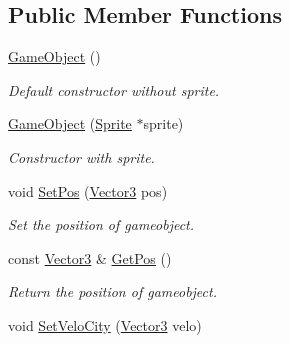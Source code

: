 \subsection*{Public Member Functions}
\begin{DoxyCompactItemize}
\item 
\mbox{\label{class_game_object_a0348e3ee2e83d56eafca7a3547f432c4}} 
\mbox{\hyperlink{class_game_object_a0348e3ee2e83d56eafca7a3547f432c4}{Game\+Object}} ()
\begin{DoxyCompactList}\small\item\em Default constructor without sprite. \end{DoxyCompactList}\item 
\mbox{\label{class_game_object_a8f340c31ff5aa975ae2ed7439fb5d63f}} 
\mbox{\hyperlink{class_game_object_a8f340c31ff5aa975ae2ed7439fb5d63f}{Game\+Object}} (\mbox{\hyperlink{class_sprite}{Sprite}} $\ast$sprite)
\begin{DoxyCompactList}\small\item\em Constructor with sprite. \end{DoxyCompactList}\item 
\mbox{\label{class_game_object_a53997902466d2ecb317c4318a3d69816}} 
void \mbox{\hyperlink{class_game_object_a53997902466d2ecb317c4318a3d69816}{Set\+Pos}} (\mbox{\hyperlink{class_vector3}{Vector3}} pos)
\begin{DoxyCompactList}\small\item\em Set the position of gameobject. \end{DoxyCompactList}\item 
\mbox{\label{class_game_object_ab66324d123ba785d66a11b386a5c0893}} 
const \mbox{\hyperlink{class_vector3}{Vector3}} \& \mbox{\hyperlink{class_game_object_ab66324d123ba785d66a11b386a5c0893}{Get\+Pos}} ()
\begin{DoxyCompactList}\small\item\em Return the position of gameobject. \end{DoxyCompactList}\item 
\mbox{\label{class_game_object_a82d69d7c9ee269b19cc3528b64281355}} 
void \mbox{\hyperlink{class_game_object_a82d69d7c9ee269b19cc3528b64281355}{Set\+Velo\+City}} (\mbox{\hyperlink{class_vector3}{Vector3}} velo)

\end{DoxyCompactItemize}
